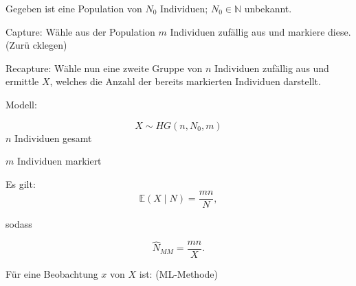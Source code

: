 \documentclass[10pt]{article}
\newcommand{\EW}{\mathbb{E}} %
\newenvironment{BSP}[1][]
{\begin{Beispiel}[frametitle=#1]}{\end{Beispiel}}
\begin{document}
	\begin{BSP}[Beispiel 1.3.9 (Schätzung der Populationsgröße mit der Capture/Recapture-Methode)]
		Gegeben ist eine Population von $N_0$ Individuen; $N_0 \in \mathbb{N}$ unbekannt. 
		
		Capture: Wähle aus der Population $m$ Individuen zufällig aus und markiere diese. (Zurü cklegen)
		
		Recapture: Wähle nun eine zweite Gruppe von $n$ Individuen zufällig aus und ermittle $X$, welches die Anzahl der bereits markierten Individuen darstellt. 
		
		Modell:
		
		\begin{equation*}
			X \sim HG(n,N_0,m)
		\end{equation*}
		$n$ Individuen gesamt
		
		$m$ Individuen markiert
		
		Es gilt:
		\begin{equation*}
			\EW(X \mid N) = \frac{mn}{N},
		\end{equation*}
		
		sodass
		
		\begin{equation*}
			\hat{N}_{MM}=\frac{mn}{X}.
		\end{equation*}
		
		Für eine Beobachtung $x$ von $X$ ist: (ML-Methode)
		

\end{BSP}
\end{document}
